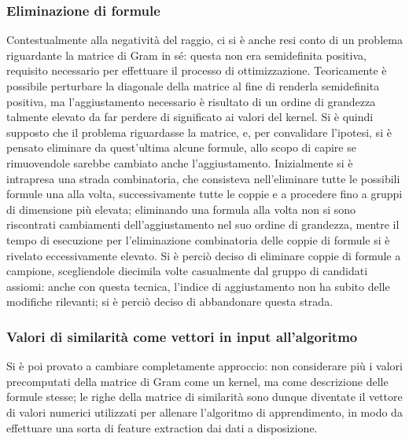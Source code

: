 \documentclass[12pt,a4paper]{report}
\begin{document}
\subsubsection{Eliminazione di formule}
Contestualmente alla negatività del raggio, ci si è anche resi conto di un problema riguardante la matrice di Gram in sé: questa non era semidefinita positiva, requisito necessario per effettuare il processo di ottimizzazione. Teoricamente è possibile perturbare la diagonale della matrice al fine di renderla semidefinita positiva, ma l'aggiustamento necessario è risultato di un ordine di grandezza talmente elevato da far perdere di significato ai valori del kernel. Si è quindi supposto che il problema riguardasse la matrice, e, per convalidare l'ipotesi, si è pensato eliminare da quest'ultima alcune formule, allo scopo di capire se rimuovendole sarebbe cambiato anche l'aggiustamento. Inizialmente si è intrapresa una strada combinatoria, che consisteva nell'eliminare tutte le possibili formule una alla volta, successivamente tutte le coppie e a procedere fino a gruppi di dimensione più elevata; eliminando una formula alla volta non si sono riscontrati cambiamenti dell'aggiustamento nel suo ordine di grandezza, mentre il tempo di esecuzione per l'eliminazione combinatoria delle coppie di formule si è rivelato eccessivamente elevato. Si è perciò deciso di eliminare coppie di formule a campione, scegliendole diecimila volte casualmente dal gruppo di candidati assiomi: anche con questa tecnica, l'indice di aggiustamento non ha subito delle modifiche rilevanti; si è perciò deciso di abbandonare questa strada. 

\subsubsection{Valori di similarità come vettori in input all'algoritmo}
\label{vettoriSection}


Si è poi provato a cambiare completamente approccio: non considerare più i valori precomputati della matrice di Gram come un kernel, ma come descrizione delle formule stesse; le righe della matrice di similarità sono dunque diventate il vettore di valori numerici utilizzati per allenare l'algoritmo di apprendimento, in modo da effettuare una sorta di feature extraction \cite{featureExtraction} dai dati a disposizione.
\end{document}
